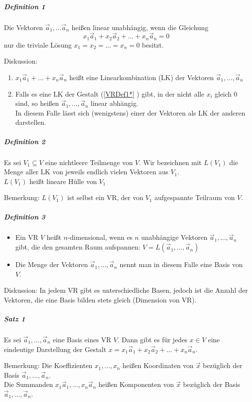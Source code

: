 \documentclass[a4paper]{scrartcl}
\begin{document}
\subparagraph{Definition 1} Die Vektoren $\vec{a}_1, \dots \vec{a}_n$ heißen linear unabhängig, wenn die Gleichung \begin{equation} \label{VRDef1*} x_1 \vec{a}_1 + x_2 \vec{a}_2 + \dots + x_n \vec{a}_n = 0\end{equation}  nur die triviale Lösung $x_1=x_2=\dots = x_n=0$ besitzt.

Diskussion:
\begin{enumerate}
\item $x_1\vec{a}_1 + \dots + x_n\vec{a}_n$ heißt eine Linearkombination (LK) der Vektoren $\vec{a}_1,\dots , \vec{a}_n$
\item Falls es eine LK der Gestalt (\ref{VRDef1*} ) gibt, in der nicht alle $x_i$ gleich 0 sind, so heißen $\vec{a}_1,\dots , \vec{a}_n$ linear abhängig.\\
In diesem Falle lässt sich (wenigstens) einer der Vektoren als LK der anderen darstellen.
\end{enumerate}
\subparagraph{Definition 2} Es sei $V_1 \subseteq V$ eine nichtleere Teilmenge von $V$. Wir bezeichnen mit $L(V_1)$ die Menge aller LK von jeweils endlich vielen Vektoren aus $V_1$.\\
$L(V_1)$ heißt lineare Hülle von $V_1$

Bemerkung: $L(V_1)$ ist selbst ein VR, der von $V_1$ aufgespannte Teilraum von $V$.

\subparagraph{Definition 3}
\begin{itemize}
\item Ein VR $V$ heißt $n$-dimensional, wenn es $n$ unabhängige Vektoren $\vec{a}_1, \dots , \vec{a}_n$ gibt, die den gesamten Raum aufspannen: $V=L(\vec{a}_1, \dots ,\vec{a}_n)$
\item Die Menge der Vektoren $\vec{a}_1 , \dots ,\vec{a}_n$ nennt man in diesem Falle eine Basis von $V$.
\end{itemize}

Diskussion: In jedem VR gibt es unterschiedliche Basen, jedoch ist die Anzahl der Vektoren, die eine Basis bilden stets gleich (Dimension von VR).

\subparagraph{Satz 1} Es sei $\vec{a}_1, \dots , \vec{a}_n$ eine Basis eines VR $V$. Dann gibt es für jedes $x \in V$ eine eindeutige Darstellung der Gestalt $x=x_1\vec{a}_1 + x_2\vec{a}_2 + \dots + x_n \vec{a}_n$.

Bemerkung: Die Koeffizienten $x_1, \dots , x_n$ heißen Koordinaten von $\vec{x}$ bezüglich der Basis $\vec{a}_1, \dots , \vec{a}_n$.\\
Die Summanden $x_1 \vec{a}_1, \dots , x_n \vec{a}_n$ heißen Komponenten von $\vec{x}$ bezüglich der Basis $\vec{a}_1, \dots , \vec{a}_n$.
\end{document}
